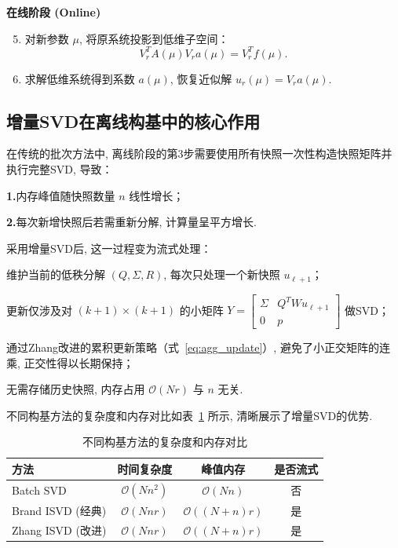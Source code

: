 \noindent\textbf{在线阶段 (Online)}
\begin{enumerate}
    \setcounter{enumi}{4}
    \item 对新参数 $\mu$, 将原系统投影到低维子空间：
    \[
    V_r^T A(\mu) V_r a(\mu) = V_r^T f(\mu).
    \]
    \item 求解低维系统得到系数 $a(\mu)$, 恢复近似解 $u_r(\mu) = V_r a(\mu)$.
\end{enumerate}

\subsection{增量SVD在离线构基中的核心作用}
在传统的批次方法中, 离线阶段的第3步需要使用所有快照一次性构造快照矩阵并执行完整SVD, 导致：

\noindent \textbf{1.}内存峰值随快照数量 $n$ 线性增长；

\noindent \textbf{2.}每次新增快照后若需重新分解, 计算量呈平方增长.

采用增量SVD后, 这一过程变为流式处理：

\noindent 维护当前的低秩分解 $(Q,\Sigma,R)$, 每次只处理一个新快照 $u_{\ell+1}$；

\noindent 更新仅涉及对 $(k+1)\times(k+1)$ 的小矩阵 $Y = \begin{bmatrix}\Sigma & Q^T W u_{\ell+1}\\0 & p\end{bmatrix}$ 做SVD；

\noindent 通过Zhang改进的累积更新策略（式~\eqref{eq:agg_update}）, 避免了小正交矩阵的连乘, 正交性得以长期保持；

\noindent 无需存储历史快照, 内存占用 $\mathcal{O}(Nr)$ 与 $n$ 无关.


不同构基方法的复杂度和内存对比如表~\ref{tab:complexity} 所示, 清晰展示了增量SVD的优势.

\begin{table}[H]
\centering
\caption{不同构基方法的复杂度和内存对比}
\label{tab:complexity}
\begin{tabular}{lccc}
\hline
方法 & 时间复杂度 & 峰值内存 & 是否流式 \\
\hline
Batch SVD & $\mathcal{O}(N n^2)$\footnotemark[1] & $\mathcal{O}(N n)$ & 否 \\
Brand ISVD (经典) & $\mathcal{O}(N n r)$ & $\mathcal{O}((N+n)r)$ & 是 \\
Zhang ISVD (改进) & $\mathcal{O}(N n r)$ & $\mathcal{O}((N+n)r)$ & 是 \\
\hline
\end{tabular}
\end{table}

